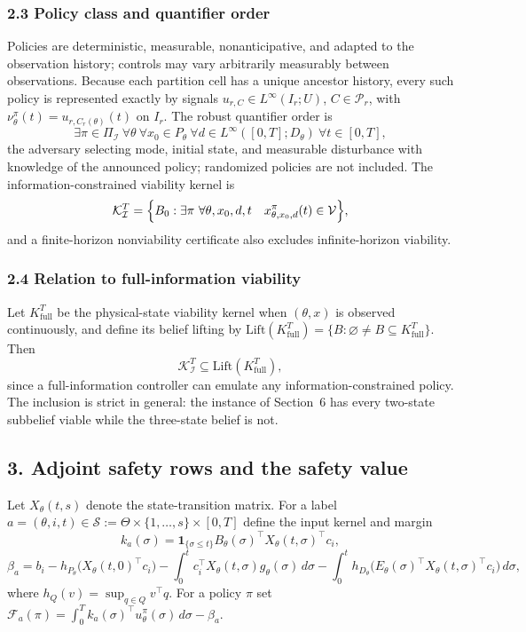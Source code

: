 \documentclass[10pt,twocolumn]{article}
\theoremstyle{definition}
\begin{document}
\subsubsection{2.3 Policy class and quantifier order}\label{policy}

Policies are deterministic, measurable, nonanticipative, and adapted to the
observation history; controls may vary arbitrarily measurably between
observations. Because each partition cell has a unique ancestor history, every
such policy is represented exactly by signals
\(u_{r,C} \in L^\infty(I_r; U)\), \(C \in \mathcal{P}_r\), with
\(\nu^\pi_\theta(t) = u_{r,C_r(\theta)}(t)\) on \(I_r\). The robust quantifier
order is
\[
\exists \pi \in \Pi_{\mathcal{I}}\ \forall \theta\ \forall x_0 \in P_\theta\ 
\forall d \in L^\infty([0,T]; D_\theta)\ \forall t \in [0,T],
\]
the adversary selecting mode, initial state, and measurable disturbance with
knowledge of the announced policy; randomized policies are not included. The
information-constrained viability kernel is
\[
\mathcal{K}_{\mathcal{I}}^T = \Bigl\{ B_0 : \exists \pi\ \forall \theta, x_0,
d, t \quad x^{\pi}_{\theta, x_0, d}(t) \in \mathcal{V} \Bigr\},
\]
and a finite-horizon nonviability certificate also excludes infinite-horizon
viability.

\subsubsection{2.4 Relation to full-information viability}\label{fullinfo}

Let \(K^T_{\mathrm{full}}\) be the physical-state viability kernel when
\((\theta, x)\) is observed continuously, and define its belief lifting by
\(\mathrm{Lift}(K^T_{\mathrm{full}}) = \{ B : \varnothing \ne B \subseteq
K^T_{\mathrm{full}} \}\). Then
\[
\mathcal{K}_{\mathcal{I}}^T \subseteq \mathrm{Lift}(K^T_{\mathrm{full}}),
\]
since a full-information controller can emulate any information-constrained
policy. The inclusion is strict in general: the instance of Section~6 has
every two-state subbelief viable while the three-state belief is not.

\subsection{3. Adjoint safety rows and the safety value}\label{rows}

Let \(X_\theta(t,s)\) denote the state-transition matrix. For a label
\(a = (\theta, i, t) \in \mathscr{S} := \Theta \times \{1,\dots,s\} \times
[0,T]\) define the input kernel and margin
\[
k_a(\sigma) = \mathbf{1}_{\{\sigma \le t\}} B_\theta(\sigma)^\top
X_\theta(t,\sigma)^\top c_i,
\]
\[
\beta_a = b_i - h_{P_\theta}\!\bigl(X_\theta(t,0)^\top c_i\bigr)
- \int_0^t c_i^\top X_\theta(t,\sigma) g_\theta(\sigma)\, d\sigma
- \int_0^t h_{D_\theta}\!\bigl(E_\theta(\sigma)^\top
X_\theta(t,\sigma)^\top c_i\bigr)\, d\sigma,
\]
where \(h_Q(v) = \sup_{q \in Q} v^\top q\). For a policy \(\pi\) set
\(\mathcal{F}_a(\pi) = \int_0^T k_a(\sigma)^\top u^\pi_\theta(\sigma)\,
d\sigma - \beta_a\).
\end{document}
